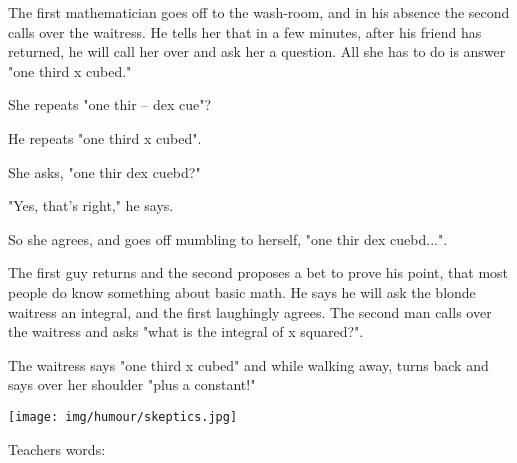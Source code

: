 The first mathematician goes off to the wash-room, and in his absence the second calls over the waitress. He tells her that in a few minutes, after his friend has returned, he will call her over and ask her a question. All she has to do is answer "one third x cubed." 

She repeats "one thir -- dex cue"?

He repeats "one third x cubed".

She asks, "one thir dex cuebd?"

"Yes, that's right," he says.

So she agrees, and goes off mumbling to herself, "one thir dex cuebd...". 

The first guy returns and the second proposes a bet to prove his point, that most people do know something about basic math. He says he will ask the blonde waitress an integral, and the first laughingly agrees. The second man calls over the waitress and asks "what is the integral of x squared?".

The waitress says "one third x cubed" and while walking away, turns back and says over her shoulder "plus a constant!"
	\begin{center}\underline{\hspace{5 cm}}\end{center}
	\begin{center}
		\texttt{[image: img/humour/skeptics.jpg]}	
	\end{center}
	\begin{center}\underline{\hspace{5 cm}}\end{center}
Teachers words:

